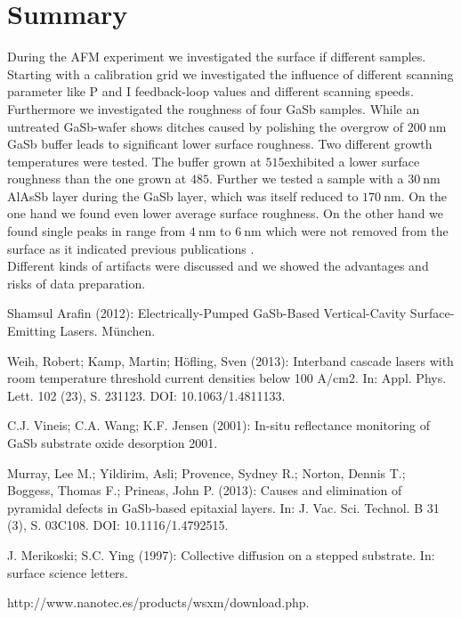 \documentclass[paper=a4,fontsize=10pt,DIV=18,twocolumn,parskip=half]{scrartcl}
\numberwithin{equation}{section}    %
\begin{document}
\section{Summary}
During the AFM experiment we investigated the surface if different samples.  
Starting with a calibration grid we investigated the influence of different 
scanning parameter like P and I feedback-loop values and different scanning 
speeds. Furthermore we investigated the roughness of four GaSb samples. While an 
untreated GaSb-wafer shows ditches caused by polishing the overgrow of 
$\SI{200}{\nano\meter}$ GaSb buffer leads to significant lower surface 
roughness. Two different growth temperatures were tested.
The buffer grown at $515$\textdegree exhibited a lower surface roughness than 
the one grown at $485$\textdegree. Further we tested a sample with a 
$\SI{30}{\nano\meter}$ AlAsSb layer during the GaSb layer, which was itself 
reduced to $\SI{170}{\nano\meter}$. On the one hand we found even lower average 
surface roughness. On the other hand we found single peaks in range from 
$\SI{4}{\nano\meter}$ to $\SI{6}{\nano\meter}$ which were not removed from the 
surface as it indicated previous publications \cite{murray}.\\
Different kinds of artifacts were discussed and we showed the advantages and 
risks of data preparation.

\begin{thebibliography}{}   

 Shamsul Arafin (2012): Electrically-Pumped GaSb-Based 
Vertical-Cavity Surface-Emitting Lasers. München.

 Weih, Robert; Kamp, Martin; Höfling, Sven (2013): Interband 
cascade lasers with room temperature threshold current densities below 100 
A/cm2. In: Appl. Phys. Lett. 102 (23), S. 231123. DOI: 10.1063/1.4811133.

 C.J. Vineis; C.A. Wang; K.F. Jensen (2001): In-situ reflectance 
monitoring of GaSb substrate oxide desorption 2001.

 Murray, Lee M.; Yildirim, Asli; Provence, Sydney R.; Norton, 
Dennis T.; Boggess, Thomas F.; Prineas, John P. (2013): Causes and elimination 
of pyramidal defects in GaSb-based epitaxial layers. In: J. Vac. Sci. Technol. B 
31 (3), S. 03C108. DOI: 10.1116/1.4792515.
  
 J. Merikoski; S.C. Ying (1997): Collective diffusion on a stepped substrate. In: surface science letters.

 http://www.nanotec.es/products/wsxm/download.php. 
\end{thebibliography}
%
%
\onecolumn
\pagestyle{empty}
\appendix

\end{document}
